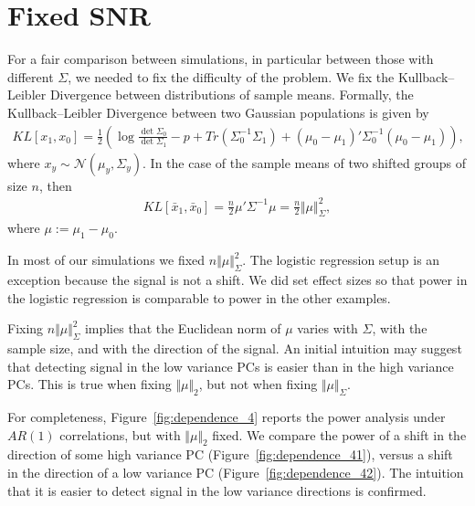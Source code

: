 \documentclass[]{bio}
\begin{document}
\section{Fixed SNR}
\label{sec:fix_snr}

For a fair comparison between simulations, in particular between those with different $\Sigma$, we needed to fix the difficulty of the problem.
We fix the Kullback–Leibler Divergence between distributions of sample means. 
Formally, the Kullback–Leibler Divergence between two Gaussian populations is given by 
\begin{align}
\label{eq:KLD}
KL[x_1,x_0]=\frac{1}{2}\left(
\log \frac{\det \Sigma_0}{\det \Sigma_1}-p+Tr(\Sigma_0^{-1}\Sigma_1)+(\mu_0-\mu_1)'\Sigma^{-1}_0(\mu_0-\mu_1)
\right),
\end{align}
where $x_y\sim\mathcal{N}(\mu_y,\Sigma_y)$.
In the case of the sample means of two shifted groups of size $n$, then 
\begin{align}
\label{eq:mahalanobis}
KL[\bar x_1,\bar x_0]=
\frac{n}{2}\mu'\Sigma^{-1}\mu=
\frac{n}{2}\Vert \mu \Vert_\Sigma^2,
\end{align}
where $\mu:=\mu_1-\mu_0$. 

In most of our simulations we fixed $n \Vert \mu \Vert_\Sigma^2$. 
The logistic regression setup is an exception because the signal is not a shift. 
We did set effect sizes so that power in the logistic regression is comparable to power in the other examples.

Fixing $n \Vert \mu \Vert_\Sigma^2$ implies that the Euclidean norm of $\mu$ varies with $\Sigma$, with the sample size, and with the direction of the signal.
An initial intuition may suggest that detecting signal in the low variance PCs is easier than in the high variance PCs. 
This is true when fixing $\Vert \mu \Vert_2$, but not when fixing $\Vert \mu \Vert_{\Sigma}$.

For completeness, Figure~\ref{fig:dependence_4} reports the power analysis under $AR(1)$ correlations, but with $\Vert \mu \Vert_2$ fixed.
We compare the power of a shift in the direction of some high variance PC (Figure~\ref{fig:dependence_41}), versus a shift in the direction of a low variance PC (Figure~\ref{fig:dependence_42}).
The intuition that it is easier to detect signal in the low variance directions is confirmed. 
\end{document}
